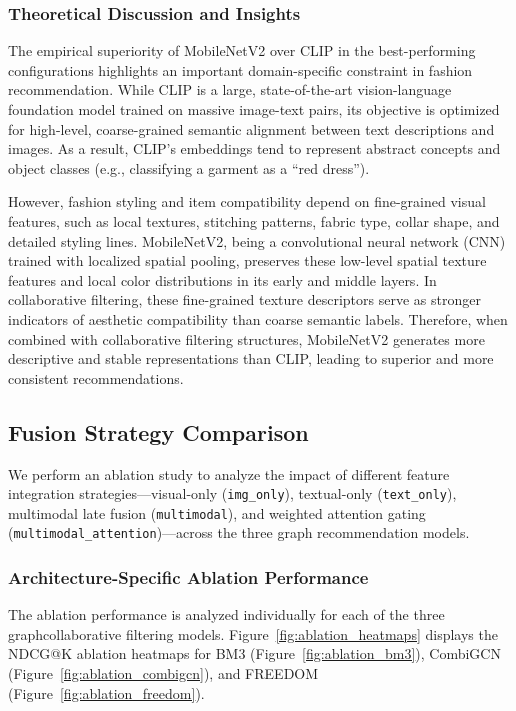 \subsubsection{Theoretical Discussion and Insights}

The empirical superiority of MobileNetV2 over CLIP in the best-performing configurations highlights an important domain-specific constraint in fashion recommendation. While CLIP is a large, state-of-the-art vision-language foundation model trained on massive image-text pairs, its objective is optimized for high-level, coarse-grained semantic alignment between text descriptions and images. As a result, CLIP's embeddings tend to represent abstract concepts and object classes (e.g., classifying a garment as a ``red dress''). 

However, fashion styling and item compatibility depend on fine-grained visual features, such as local textures, stitching patterns, fabric type, collar shape, and detailed styling lines. MobileNetV2, being a convolutional neural network (CNN) trained with localized spatial pooling, preserves these low-level spatial texture features and local color distributions in its early and middle layers. In collaborative filtering, these fine-grained texture descriptors serve as stronger indicators of aesthetic compatibility than coarse semantic labels. Therefore, when combined with collaborative filtering structures, MobileNetV2 generates more descriptive and stable representations than CLIP, leading to superior and more consistent recommendations.

\subsection{Fusion Strategy Comparison}

We perform an ablation study to analyze the impact of different feature integration strategies---visual-only (\texttt{img\_only}), textual-only (\texttt{text\_only}), multimodal late fusion (\texttt{multimodal}), and weighted attention gating (\texttt{multimodal\_attention})---across the three graph recommendation models.

\subsubsection{Architecture-Specific Ablation Performance}

The ablation performance is analyzed individually for each of the three graphcollaborative filtering models. Figure~\ref{fig:ablation_heatmaps} displays the NDCG@K ablation heatmaps for BM3 (Figure~\ref{fig:ablation_bm3}), CombiGCN (Figure~\ref{fig:ablation_combigcn}), and FREEDOM (Figure~\ref{fig:ablation_freedom}).

